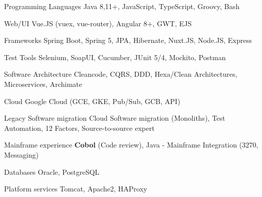 

\begin{cvskills}
\cvskill
{Programming Languages} %
{Java 8,11+, JavaScript, TypeScript, Groovy, Bash} %

\cvskill
{Web/UI} %
{Vue.JS (vuex, vue-router), Angular 8+, GWT, EJS} %

\cvskill
{Frameworks} %
{Spring Boot, Spring 5, JPA, Hibernate, Nuxt.JS, Node.JS, Express} %

\cvskill
{Test Tools} %
{Selenium, SoapUI, Cucumber, JUnit 5/4, Mockito, Postman} %

\cvskill
{Software Architecture} %
{Cleancode, CQRS, DDD, Hexa/Clean Architectures, Microservices, Archimate} %

\cvskill
{Cloud} %
{Google Cloud (GCE, GKE, Pub/Sub, GCB, API)} %

\cvskill
{Legacy Software migration} %
{Cloud Software migration (Monoliths), Test Automation, 12 Factors, Source-to-source expert} %

\cvskill
{Mainframe experience} %
{\textbf{Cobol} (Code review), Java - Mainframe Integration (3270, Messaging)} %

\cvskill
{Databases} %
{Oracle, PostgreSQL} %


\cvskill
{Platform services} %
{Tomcat, Apache2, HAProxy} %

\end{cvskills}



